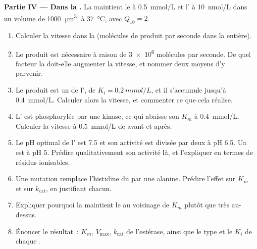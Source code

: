 \begin{problem}
\medskip
\noindent\textbf{Partie IV --- Dans la .}
La  maintient le  à \qty{0.5}{mmol/L} et l' à
\qty{10}{nmol/L} dans un volume de \qty{1000}{\micro m^3}, à
\qty{37}{\celsius}, avec $Q_{10} = 2$.
\begin{enumerate}[resume]
  \item Calculer la vitesse dans la  (molécules de produit par
        seconde dans la  entière).
  \item Le produit est nécessaire à raison de \qty{3e6}{} molécules par
        seconde. De quel facteur la  doit-elle augmenter la
        vitesse, et nommer deux moyens d'y parvenir.
  \item Le produit est un   de l', de
        $K_i = \qty{0.2}{mmol/L}$, et il s'accumule jusqu'à
        \qty{0.4}{mmol/L}. Calculer alors la vitesse, et commenter ce
        que cela réalise.
  \item L' est phosphorylée par une kinase, ce qui abaisse son
        $K_m$ à \qty{0.4}{mmol/L}. Calculer la vitesse à
        \qty{0.5}{mmol/L} de  avant et après.
  \item Le pH optimal de l' est 7.5 et son activité est divisée
        par deux à pH 6.5. Un  est à pH 5. Prédire
        qualitativement son activité là, et l'expliquer en termes de
        résidus ionisables.
  \item Une mutation remplace l'histidine du  par une alanine.
        Prédire l'effet sur $K_m$ et sur $k_{\text{cat}}$, en justifiant
        chacun.
  \item Expliquer pourquoi la  maintient le  au
        voisinage de $K_m$ plutôt que très au-dessus.
  \item Énoncer le résultat~: $K_m$, $V_{\max}$, $k_{\text{cat}}$ de
        l'estérase, ainsi que le type et le $K_i$ de chaque .
\end{enumerate}
\end{problem}

